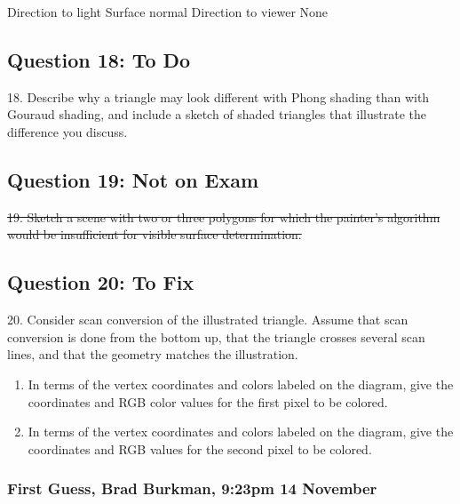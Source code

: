 \documentclass[11pt]{article}
\begin{document}
\begin{spacing}{1.2}
\begin{enumerate}[label=\arabic*)]
	Direction to light \qquad Surface normal \qquad Direction to viewer \qquad None

\end{enumerate}

\subsection{Question 18: To Do}
18.  Describe why a triangle may look different with Phong shading than with Gouraud shading, and include a sketch of shaded triangles that illustrate the difference you discuss. 

\subsection{Question 19:  Not on Exam}
\sout{19.  Sketch a scene with two or three polygons for which the painter's algorithm would be insufficient for visible surface determination.  }

\subsection{Question 20:  To Fix}
20.  Consider scan conversion of the illustrated triangle.  Assume that scan conversion is done from the bottom up, that the triangle crosses several scan lines, and that the geometry matches the illustration.  


\begin{enumerate}[label=\arabic*)]
	\item In terms of the vertex coordinates and colors labeled on the diagram, give the coordinates and RGB color values for the first pixel to be colored.  
	\item In terms of the vertex coordinates and colors labeled on the diagram, give the coordinates and RGB values for the second pixel to be colored.  
\end{enumerate}

\subsubsection{First Guess, Brad Burkman, 9:23pm 14 November}


\end{spacing}
\end{document}
